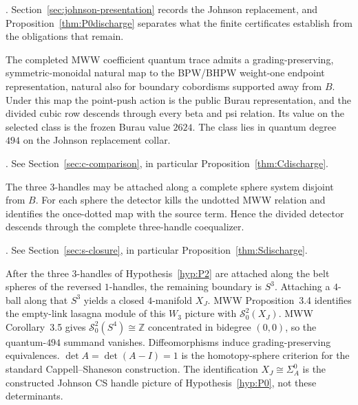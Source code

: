 \begin{remark}[Status of P0]
\Open.  Section~\ref{sec:johnson-presentation} records the Johnson
replacement, and Proposition~\ref{thm:P0discharge} separates what the
finite certificates establish from the obligations that remain.
\end{remark}

\begin{hypothesis}\label{hyp:P1}
The completed MWW coefficient quantum trace admits a grading-preserving,
symmetric-monoidal natural map to the BPW/BHPW weight-one endpoint
representation, natural also for boundary cobordisms supported away from
$B$.  Under this map the point-push action is the public Burau
representation, and the divided cubic row descends through every beta and psi
relation.  Its value on the selected class is the frozen Burau value
$2624$.  The class lies in quantum degree $494$ on the Johnson replacement
collar.
\end{hypothesis}

\begin{remark}[Status of C]
\Open.  See Section~\ref{sec:c-comparison}, in particular
Proposition~\ref{thm:Cdischarge}.
\end{remark}

\begin{hypothesis}\label{hyp:P2}
The three $3$-handles may be
attached along a complete sphere system disjoint from $B$.  For each sphere
the detector kills the undotted MWW relation and identifies the once-dotted
map with the source term.  Hence the divided detector descends through the
complete three-handle coequalizer.
\end{hypothesis}

\begin{remark}[Status of S]
\Open.  See Section~\ref{sec:s-closure}, in particular
Proposition~\ref{thm:Sdischarge}.
\end{remark}

\begin{hypothesis}\label{hyp:P3}
After the three $3$-handles of Hypothesis~\ref{hyp:P2} are attached along
the belt spheres of the reversed $1$-handles, the remaining boundary is
$S^3$.  Attaching a $4$-ball along that $S^3$ yields a closed $4$-manifold
$X_J$.  MWW Proposition~3.4 identifies the empty-link lasagna module of this
$W_3$ picture with $\mathcal S^2_0(X_J)$.  MWW Corollary~3.5 gives
$\mathcal S^2_0(S^4)\cong\mathbb Z$ concentrated in bidegree $(0,0)$, so
the quantum-$494$ summand vanishes.  Diffeomorphisms induce
grading-preserving equivalences.  $\det A=\det(A-I)=1$ is the
homotopy-sphere criterion for the standard Cappell--Shaneson construction.
The identification $X_J\cong\Sigma_A^0$ is the constructed Johnson CS
handle picture of Hypothesis~\ref{hyp:P0}, not these determinants.
\end{hypothesis}

